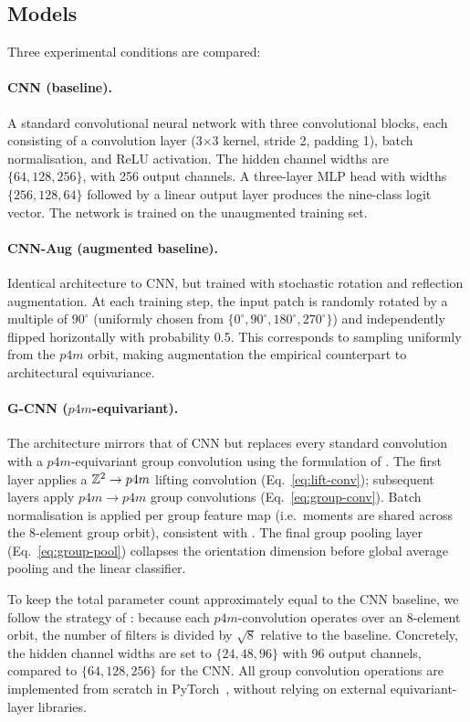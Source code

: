 \subsection{Models}

Three experimental conditions are compared:

\paragraph{CNN (baseline).}
A standard convolutional neural network with three convolutional blocks, each consisting
of a convolution layer (3\(\times\)3 kernel, stride 2, padding 1), batch normalisation, and
ReLU activation. The hidden channel widths are \(\{64, 128, 256\}\), with 256 output
channels. A three-layer MLP head with widths \(\{256, 128, 64\}\) followed by a linear
output layer produces the nine-class logit vector. The network is trained on the
unaugmented training set.

\paragraph{CNN-Aug (augmented baseline).}
Identical architecture to CNN, but trained with stochastic rotation and reflection
augmentation. At each training step, the input patch is randomly rotated by a multiple
of \(90^\circ\) (uniformly chosen from \(\{0^\circ, 90^\circ, 180^\circ, 270^\circ\}\)) and
independently flipped horizontally with probability 0.5. This corresponds to sampling
uniformly from the \(p4m\) orbit, making augmentation the empirical counterpart to
architectural equivariance.

\paragraph{G-CNN (\(p4m\)-equivariant).}
The architecture mirrors that of CNN but replaces every standard convolution with a
\(p4m\)-equivariant group convolution using the formulation of
\citet{cohen2016group}. The first layer applies a \(\mathbb{Z}^2 \to p4m\) lifting convolution
(Eq.~\ref{eq:lift-conv}); subsequent layers apply \(p4m \to p4m\) group convolutions
(Eq.~\ref{eq:group-conv}). Batch normalisation is applied per group feature map (i.e.\
moments are shared across the 8-element group orbit), consistent with
\citet{veeling2018rotation}. The final group pooling layer (Eq.~\ref{eq:group-pool})
collapses the orientation dimension before global average pooling and the linear
classifier.

To keep the total parameter count approximately equal to the CNN baseline, we follow
the strategy of \citet{cohen2016group}: because each \(p4m\)-convolution operates over
an 8-element orbit, the number of filters is divided by \(\sqrt{8}\) relative to the
baseline. Concretely, the hidden channel widths are set to \(\{24, 48, 96\}\) with 96
output channels, compared to \(\{64, 128, 256\}\) for the CNN. All group convolution
operations are implemented from scratch in PyTorch~\citep{paszke2019pytorch}, without
relying on external equivariant-layer libraries.

